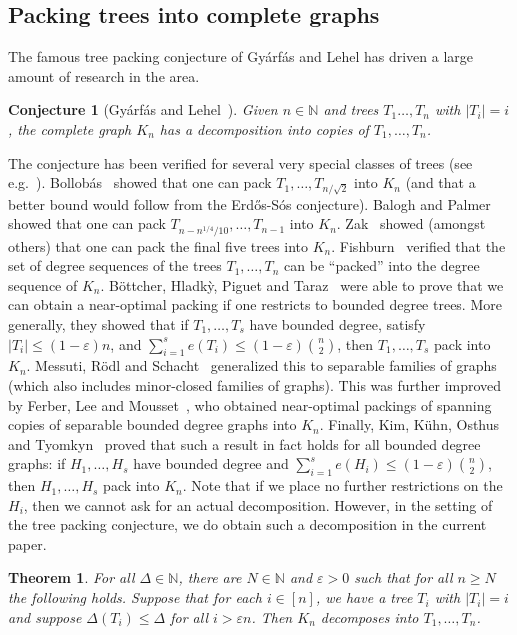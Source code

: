\documentclass[a4paper, 11pt, reqno]{amsart}
\newtheorem{theorem}[definition]{Theorem}
\newtheorem{conjecture}[definition]{Conjecture}
\numberwithin{equation}{section}
\newcommand{\1}{{\rm 1\hspace*{-0.4ex}%
\rule{0.1ex}{1.52ex}\hspace*{0.2ex}}}
\newcommand{\N}{\mathbb N}
\renewcommand{\epsilon}{\varepsilon}
\begin{document}
\subsection{Packing trees into complete graphs}

The famous tree packing conjecture of Gy\'arf\'as and Lehel has driven a large amount of research in the area.

\begin{conjecture}[Gy\'arf\'as and Lehel~\cite{GL78}] \label{gyarfaslehel}
Given $n\in\N$ and trees $T_1\ldots,T_n$ with $|T_i|=i$,
the complete graph $K_n$ has a decomposition into copies of $T_1,\ldots, T_n$. 
\end{conjecture}

The conjecture has been verified for several very special classes of trees (see e.g.~\cite{Dob02, GL78, HBK87, Rod88, Zak15}). 
Bollob\'{a}s~\cite{Bol83} showed that one can pack $T_1,\dots, T_{n/\sqrt{2}}$ into $K_n$
(and that a better bound would follow from the Erd\H os-S\'os conjecture). 
Balogh and Palmer~\cite{BP13} showed that one can pack $T_{n-n^{1/4}/10},\dots, T_{n-1}$ into $K_{n}$. 
Zak~\cite{Zak15} showed (amongst others) that one can pack the final five trees into $K_n$. 
Fishburn~\cite{Fis83} verified that the set of degree sequences of the trees $T_1,\dots,T_n$ can be ``packed'' into the degree sequence of $K_n$. B\"ottcher, Hladk\`y, Piguet and Taraz~\cite{BHPT16} were able to prove that we can obtain a near-optimal packing if one restricts to bounded degree trees. 
More generally, they showed that if $T_1,\dots, T_s$ have bounded degree, satisfy $|T_i|\leq (1-\epsilon)n$, and $\sum_{i=1}^{s} e(T_i) \leq (1-\epsilon) \binom{n}{2}$, then $T_1,\dots, T_s$ pack into $K_n$.
Messuti, R\"odl and Schacht~\cite{MRS16} generalized this to separable families of graphs
(which also includes minor-closed families of graphs). 
This was further improved by Ferber, Lee and Mousset~\cite{FLM15}, who obtained near-optimal packings of spanning copies of separable bounded degree graphs into $K_{n}$. 
Finally, Kim, K\"uhn, Osthus and Tyomkyn~\cite{KKOT16} proved that such a result in fact holds for all bounded degree graphs: if $H_1,\dots, H_s$ have bounded degree and $\sum_{i=1}^{s} e(H_i) \leq (1-\epsilon) \binom{n}{2}$, 
then $H_1,\dots, H_s$ pack into $K_n$. Note that if we place no further restrictions on the $H_i$, then we cannot ask for an actual decomposition. 
However, in the setting of the tree packing conjecture, we do obtain such a decomposition in the current paper.

\begin{theorem}\label{thm:glboundeddegree}
For all $\Delta \in \N$, 
there are $N\in \N$ and $\epsilon>0$ such that for all $n\geq N$ the following holds. 
Suppose that for each $i\in [n]$, we have a tree $T_i$ with $|T_i|= i$ and suppose $\Delta(T_i)\leq \Delta$ for all $i> \epsilon n$. 
Then $K_n$ decomposes into $T_1,\dots, T_n$.
\end{theorem}
\end{document}
